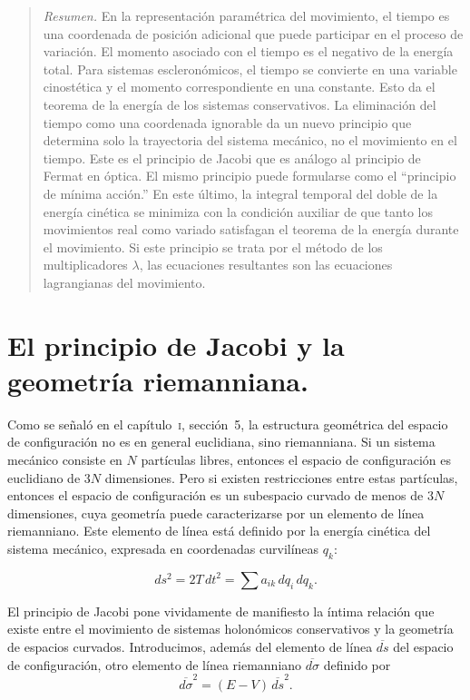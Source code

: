 \documentclass[12pt,a4paper]{book}
\begin{document}
\begin{quote}
\textit{Resumen.} En la representación paramétrica del movimiento, el tiempo es una coordenada de posición adicional que puede participar en el proceso de variación. El momento asociado con el tiempo es el negativo de la energía total. Para sistemas escleronómicos, el tiempo se convierte en una variable cinostética y el momento correspondiente en una constante. Esto da el teorema de la energía de los sistemas conservativos. La eliminación del tiempo como una coordenada ignorable da un nuevo principio que determina solo la trayectoria del sistema mecánico, no el movimiento en el tiempo. Este es el principio de Jacobi que es análogo al principio de Fermat en óptica. El mismo principio puede formularse como el ``principio de mínima acción.'' En este último, la integral temporal del doble de la energía cinética se minimiza con la condición auxiliar de que tanto los movimientos real como variado satisfagan el teorema de la energía durante el movimiento. Si este principio se trata por el método de los multiplicadores $\lambda$, las ecuaciones resultantes son las ecuaciones lagrangianas del movimiento.
\end{quote}

\section{El principio de Jacobi y la geometría riemanniana.}

Como se señaló en el capítulo~\textsc{i}, sección~5, la estructura geométrica del espacio de configuración no es en general euclidiana, sino riemanniana. Si un sistema mecánico consiste en $N$ partículas libres, entonces el espacio de configuración es euclidiano de $3N$ dimensiones. Pero si existen restricciones entre estas partículas, entonces el espacio de configuración es un subespacio curvado de menos de $3N$ dimensiones, cuya geometría puede caracterizarse por un elemento de línea riemanniano. Este elemento de línea está definido por la energía cinética del sistema mecánico, expresada en coordenadas curvilíneas $q_k$:


\begin{equation}
ds^2 = 2T\,dt^2 = \sum a_{ik}\,dq_i\,dq_k. \tag{57.1}
\end{equation}

El principio de Jacobi pone vividamente de manifiesto la íntima relación que existe entre el movimiento de sistemas holonómicos conservativos y la geometría de espacios curvados. Introducimos, además del elemento de línea $\overline{ds}$ del espacio de configuración, otro elemento de línea riemanniano $\overline{d\sigma}$ definido por
\begin{equation}
\overline{d\sigma}^2 = (E - V)\,\overline{ds}^2. \tag{57.2}
\end{equation}
\end{document}
